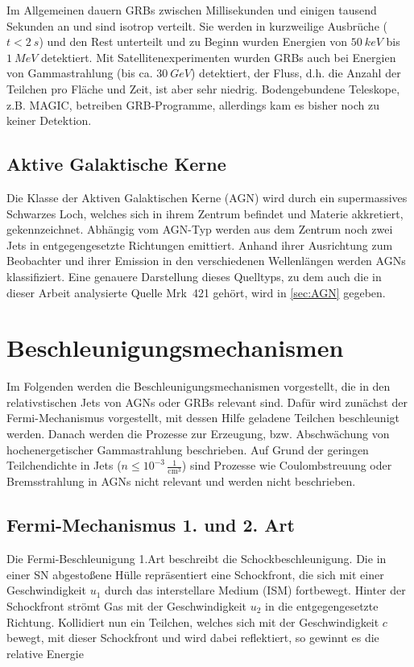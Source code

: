 Im Allgemeinen dauern GRBs zwischen Millisekunden und einigen tausend Sekunden an und sind isotrop verteilt.
Sie werden in kurzweilige Ausbrüche ($t<\SI{2}{s}$) und den Rest unterteilt und zu Beginn wurden Energien von $\SI{50}{keV}$ bis $\SI{1}{MeV}$ detektiert.
Mit Satellitenexperimenten wurden GRBs auch bei Energien von Gammastrahlung (bis ca. $\SI{30}{GeV}$) detektiert, der Fluss, d.h. die Anzahl der Teilchen pro Fläche und Zeit, ist aber sehr niedrig.
Bodengebundene Teleskope, z.B. MAGIC, betreiben GRB-Programme, allerdings kam es bisher noch zu keiner Detektion.\cite{Weekes}


\subsection{Aktive Galaktische Kerne}
Die Klasse der Aktiven Galaktischen Kerne (AGN) wird durch ein supermassives Schwarzes Loch, welches sich in ihrem Zentrum befindet und Materie akkretiert, gekennzeichnet.
Abhängig vom AGN-Typ werden aus dem Zentrum noch zwei Jets in entgegengesetzte Richtungen emittiert.  
Anhand ihrer Ausrichtung zum Beobachter und ihrer Emission in den verschiedenen Wellenlängen werden AGNs klassifiziert. 
Eine genauere Darstellung dieses Quelltyps, zu dem auch die in dieser Arbeit analysierte Quelle Mrk~421 gehört, wird in \autoref{sec:AGN} gegeben.

\section{Beschleunigungsmechanismen} 
\label{sec:Beschleunigungsmechanismen}
Im Folgenden werden die Beschleunigungsmechanismen vorgestellt, die in den relativstischen Jets von AGNs oder GRBs relevant sind.
Dafür wird zunächst der Fermi-Mechanismus vorgestellt, mit dessen Hilfe geladene Teilchen beschleunigt werden.
Danach werden die Prozesse zur Erzeugung, bzw. Abschwächung von hochenergetischer Gammastrahlung beschrieben.
Auf Grund der geringen Teilchendichte in Jets ($n\leq 10^{-3}\,\frac{1}{\text{cm}^3}$) sind Prozesse wie Coulombstreuung oder Bremsstrahlung in AGNs nicht relevant und werden nicht beschrieben.

\subsection{Fermi-Mechanismus 1. und 2. Art}
Die Fermi-Beschleunigung 1.Art beschreibt die Schockbeschleunigung.
Die in einer SN abgestoßene Hülle repräsentiert eine Schockfront, die sich mit einer Geschwindigkeit $u_1$ durch das interstellare Medium (ISM) fortbewegt. 
Hinter der Schockfront strömt Gas mit der Geschwindigkeit $u_2$ in die entgegengesetzte Richtung.
Kollidiert nun ein Teilchen, welches sich mit der Geschwindigkeit $c$ bewegt, mit dieser Schockfront und wird dabei reflektiert, so gewinnt es die relative Energie


